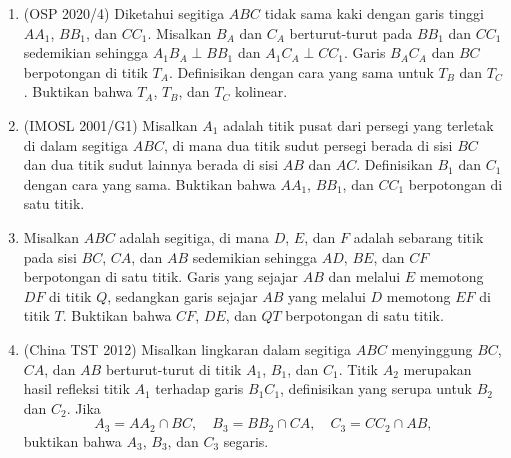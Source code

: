 \documentclass[a4paper, 11pt]{article}
\begin{document}
\begin{enumerate}
\item (OSP 2020/4) Diketahui segitiga $ABC$ tidak sama kaki dengan garis tinggi $AA_1$, $BB_1$, dan $CC_1$. Misalkan $B_A$ dan $C_A$ berturut-turut pada $BB_1$ dan $CC_1$ sedemikian sehingga $A_1B_A\;\bot\;BB_1$ dan $A_1C_A\;\bot\;CC_1$. Garis $B_AC_A$ dan $BC$ berpotongan di titik $T_A$. Definisikan dengan cara yang sama untuk $T_B$ dan $T_C$. Buktikan bahwa $T_A$, $T_B$, dan $T_C$ kolinear.
\newpage
\item (IMOSL 2001/G1) Misalkan $A_1$ adalah titik pusat dari persegi yang terletak di dalam segitiga $ABC$, di mana dua titik sudut persegi berada di sisi $BC$ dan dua titik sudut lainnya berada di sisi $AB$ dan $AC$. Definisikan $B_1$ dan $C_1$ dengan cara yang sama. Buktikan bahwa $AA_1$, $BB_1$, dan $CC_1$ berpotongan di satu titik.
\item Misalkan $ABC$ adalah segitiga, di mana $D$, $E$, dan $F$ adalah sebarang titik pada sisi $BC$, $CA$, dan $AB$ sedemikian sehingga $AD$, $BE$, dan $CF$ berpotongan di satu titik. Garis yang sejajar $AB$ dan melalui $E$ memotong $DF$ di titik $Q$, sedangkan garis sejajar $AB$ yang melalui $D$ memotong $EF$ di titik $T$. Buktikan bahwa $CF$, $DE$, dan $QT$ berpotongan di satu titik.
\item (China TST 2012) Misalkan lingkaran dalam segitiga $ABC$ menyinggung $BC$, $CA$, dan $AB$ berturut-turut di titik $A_1$, $B_1$, dan $C_1$. Titik $A_2$ merupakan hasil refleksi titik $A_1$ terhadap garis $B_1C_1$, definisikan yang serupa untuk $B_2$ dan $C_2$. Jika
\[A_3 = AA_2\cap BC,\quad B_3=BB_2\cap CA,\quad C_3=CC_2\cap AB,\]
buktikan bahwa $A_3$, $B_3$, dan $C_3$ segaris.
\end{enumerate}
\end{document}
